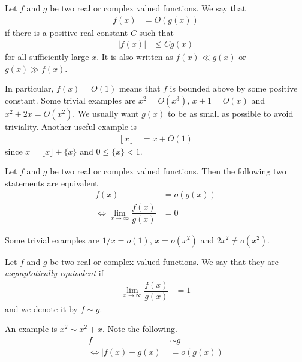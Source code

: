 \documentclass[elemannt.tex]{subfile}
\begin{document}
		\begin{definition}[Big O]
			Let $f$ and $g$ be two real or complex valued functions. We say that
				\begin{align*}
					f(x)
					& = O(g(x))
				\end{align*}
			if there is a positive real constant $C$ such that
				\begin{align*}
					|f(x)|
					& \leq Cg(x)
				\end{align*}
			for all sufficiently large $x$. It is also written as $f(x)\ll g(x)$  or $g(x)\gg f(x)$.
		\end{definition}
	In particular, $f(x)=O(1)$ means that $f$ is bounded above by some positive constant. Some trivial examples are $x^{2}=O(x^{3})$, $x+1=O(x)$ and $x^{2}+2x=O(x^{2})$. We usually want $g(x)$ to be as small as possible to avoid triviality. Another useful example is
		\begin{align*}
			\left\lfloor{x}\right\rfloor
				& = x+O(1)
		\end{align*}
	since $x=\lfloor{x}\rfloor+\{x\}$ and $0\leq \{x\}<1$.
		\begin{definition}[Small O]
			Let $f$ and $g$ be two real or complex valued functions. Then the following two statements are equivalent
				\begin{align*}
					f(x)
						& = o(g(x))\\
					\iff \lim\limits_{x\to\infty}\dfrac{f(x)}{g(x)}
						& = 0
				\end{align*}
		\end{definition}
	Some trivial examples are $1/x=o(1)$, $x=o(x^{2})$ and $2x^{2}\neq o(x^{2})$.
		\begin{definition}[Equivalence]
			Let $f$ and $g$ be two real or complex valued functions. We say that they are \textit{asymptotically equivalent} if
				\begin{align*}
					\lim\limits_{x\to\infty}\dfrac{f(x)}{g(x)}
						& = 1
				\end{align*}
			and we denote it by $f\sim g$.
		\end{definition}
	An example is $x^{2}\sim x^{2}+x$. Note the following.
		\begin{align*}
			f
				& \sim g\\
			\iff |f(x)-g(x)|
				& = o(g(x))
		\end{align*}
\end{document}
